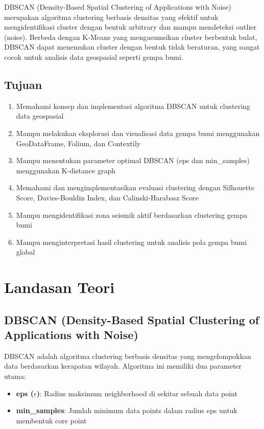 \documentclass[12pt,a4paper]{article}
\begin{document}
DBSCAN (Density-Based Spatial Clustering of Applications with Noise) merupakan algoritma clustering berbasis densitas yang efektif untuk mengidentifikasi cluster dengan bentuk arbitrary dan mampu mendeteksi outlier (noise). Berbeda dengan K-Means yang mengasumsikan cluster berbentuk bulat, DBSCAN dapat menemukan cluster dengan bentuk tidak beraturan, yang sangat cocok untuk analisis data geospasial seperti gempa bumi.

\subsection{Tujuan}
\begin{enumerate}
    \item Memahami konsep dan implementasi algoritma DBSCAN untuk clustering data geospasial
    \item Mampu melakukan eksplorasi dan visualisasi data gempa bumi menggunakan GeoDataFrame, Folium, dan Contextily
    \item Mampu menentukan parameter optimal DBSCAN (eps dan min\_samples) menggunakan K-distance graph
    \item Memahami dan mengimplementasikan evaluasi clustering dengan Silhouette Score, Davies-Bouldin Index, dan Calinski-Harabasz Score
    \item Mampu mengidentifikasi zona seismik aktif berdasarkan clustering gempa bumi
    \item Mampu menginterpretasi hasil clustering untuk analisis pola gempa bumi global
\end{enumerate}

\section{Landasan Teori}

\subsection{DBSCAN (Density-Based Spatial Clustering of Applications with Noise)}
DBSCAN adalah algoritma clustering berbasis densitas yang mengelompokkan data berdasarkan kerapatan wilayah. Algoritma ini memiliki dua parameter utama:

\begin{itemize}
    \item \textbf{eps ($\epsilon$)}: Radius maksimum neighborhood di sekitar sebuah data point
    \item \textbf{min\_samples}: Jumlah minimum data points dalam radius eps untuk membentuk core point
\end{itemize}
\end{document}
